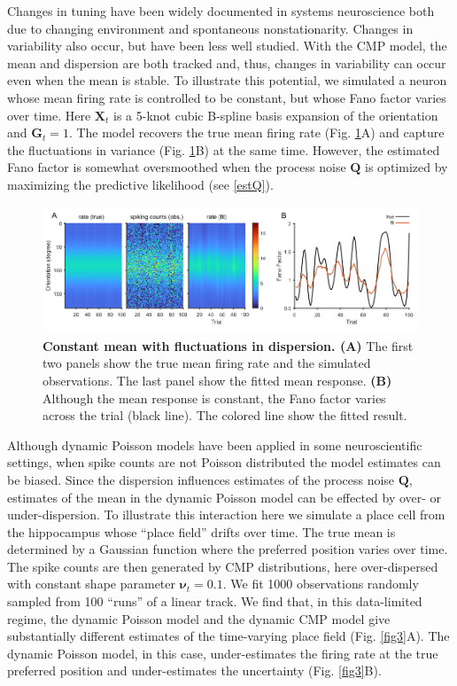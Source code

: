 \documentclass[aoas]{imsart}
\theoremstyle{plain}
\theoremstyle{remark}
\begin{document}
Changes in tuning have been widely documented in systems neuroscience both due to changing environment and spontaneous nonstationarity. Changes in variability also occur, but have been less well studied. With the CMP model, the mean and dispersion are both tracked and, thus, changes in variability can occur even when the mean is stable. To illustrate this potential, we simulated a neuron whose mean firing rate is controlled to be constant, but whose Fano factor varies over time. Here $\bm{X}_t$ is a 5-knot cubic B-spline basis expansion of the orientation and $\bm{G}_t = 1$. The model recovers the true mean firing rate (Fig. \ref{fig2}A) and capture the fluctuations in variance (Fig. \ref{fig2}B) at the same time. However, the estimated Fano factor is somewhat oversmoothed when the process noise $\bm{Q}$ is optimized by maximizing the predictive likelihood (see \ref{estQ}).

\begin{figure}[h!]
	\centering
	\includegraphics[width=1\textwidth]{figure2.png}
	\caption{\textbf{Constant mean with fluctuations in dispersion. (A)} The first two panels show the true mean firing rate and the simulated observations. The last panel show the fitted mean response. \textbf{(B)} Although the mean response is constant, the Fano factor varies across the trial (black line). The colored line show the fitted result.}
	\label{fig2}
\end{figure}

Although dynamic Poisson models have been applied in some neuroscientific settings, when spike counts are not Poisson distributed the model estimates can be biased. Since the dispersion influences estimates of the process noise $\bm{Q}$, estimates of the mean in the dynamic Poisson model can be effected by over- or under-dispersion. To illustrate this interaction here we simulate a place cell from the hippocampus whose “place field” drifts over time. The true mean is determined by a Gaussian function where the preferred position varies over time. The spike counts are then generated by CMP distributions, here over-dispersed with constant shape parameter $\bm{\nu}_t = 0.1$. We fit 1000 observations randomly sampled from 100 “runs” of a linear track. We find that, in this data-limited regime, the dynamic Poisson model and the dynamic CMP model give substantially different estimates of the time-varying place field (Fig. \ref{fig3}A). The dynamic Poisson model, in this case, under-estimates the firing rate at the true preferred position and under-estimates the uncertainty (Fig. \ref{fig3}B). 
\end{document}
